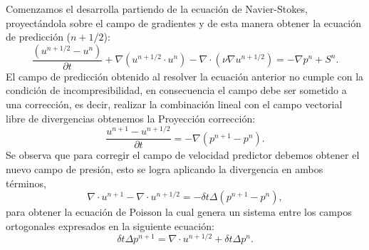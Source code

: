 \documentclass[a4paper,10pt, oneside]{book}
\begin{document}
Comenzamos el desarrolla partiendo de la ecuación de Navier-Stokes, proyectándola sobre el campo de gradientes y de esta manera obtener la ecuación de predicción ($n+1/2$):
\begin{equation}
  \frac{(u^{n+1/2} - u^n)}{\partial t} + \nabla (u^{n+1/2} \cdot u^n ) - \nabla \cdot (\nu \nabla u^{n+1/2}) = - \nabla p^n + S^n.
  \label{eq:prediccion}
\end{equation}
El campo de predicción obtenido al resolver la ecuación anterior no cumple con la condición de incompresibilidad, en consecuencia el campo debe ser sometido a una corrección, es decir, realizar la combinación lineal con el campo vectorial libre de divergencias obtenemos la Proyección corrección:
\begin{equation}
 \frac{u^{n+1} - u^{n+1/2}}{\partial t} = - \nabla (p^{n+1} - p^n).
 \label{eq:proyeccion}
\end{equation}
Se observa que para corregir el campo de velocidad predictor debemos obtener el nuevo campo de presión, esto se logra aplicando la divergencia en ambos términos,
\begin{equation}
 \nabla \cdot u^{n+1} - \nabla \cdot u^{n+1/2} = - \delta t \Delta (p^{n+1} - p^n), \nonumber
\end{equation} 
para obtener la ecuación de Poisson la cual genera un sistema entre los campos ortogonales expresados en la siguiente ecuación:
\begin{equation}
 \delta t \Delta p^{n+1}  =  \nabla \cdot u^{{n+1/2}} + \delta t \Delta p^n. \nonumber
 \label{eq:correccion}
\end{equation}
\end{document}

